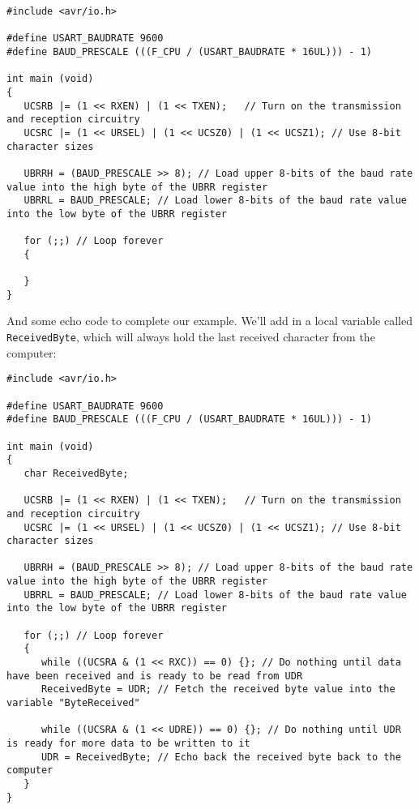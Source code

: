 \documentclass[a4paper,oneside]{book}
\begin{document}
\begin{center}
\begin{lstlisting}
#include <avr/io.h>

#define USART_BAUDRATE 9600
#define BAUD_PRESCALE (((F_CPU / (USART_BAUDRATE * 16UL))) - 1)

int main (void)
{
   UCSRB |= (1 << RXEN) | (1 << TXEN);   // Turn on the transmission and reception circuitry
   UCSRC |= (1 << URSEL) | (1 << UCSZ0) | (1 << UCSZ1); // Use 8-bit character sizes

   UBRRH = (BAUD_PRESCALE >> 8); // Load upper 8-bits of the baud rate value into the high byte of the UBRR register
   UBRRL = BAUD_PRESCALE; // Load lower 8-bits of the baud rate value into the low byte of the UBRR register

   for (;;) // Loop forever
   {

   }
}
\end{lstlisting}
\end{center}

And some echo code to complete our example. We'll add in a local variable called \texttt{ReceivedByte}, which will always hold the last received character from the computer:

\begin{center}
\begin{lstlisting}
#include <avr/io.h>

#define USART_BAUDRATE 9600
#define BAUD_PRESCALE (((F_CPU / (USART_BAUDRATE * 16UL))) - 1)

int main (void)
{
   char ReceivedByte;

   UCSRB |= (1 << RXEN) | (1 << TXEN);   // Turn on the transmission and reception circuitry
   UCSRC |= (1 << URSEL) | (1 << UCSZ0) | (1 << UCSZ1); // Use 8-bit character sizes

   UBRRH = (BAUD_PRESCALE >> 8); // Load upper 8-bits of the baud rate value into the high byte of the UBRR register
   UBRRL = BAUD_PRESCALE; // Load lower 8-bits of the baud rate value into the low byte of the UBRR register

   for (;;) // Loop forever
   {
      while ((UCSRA & (1 << RXC)) == 0) {}; // Do nothing until data have been received and is ready to be read from UDR
      ReceivedByte = UDR; // Fetch the received byte value into the variable "ByteReceived"

      while ((UCSRA & (1 << UDRE)) == 0) {}; // Do nothing until UDR is ready for more data to be written to it
      UDR = ReceivedByte; // Echo back the received byte back to the computer
   }   
}
\end{lstlisting}
\end{center}
\end{document}
